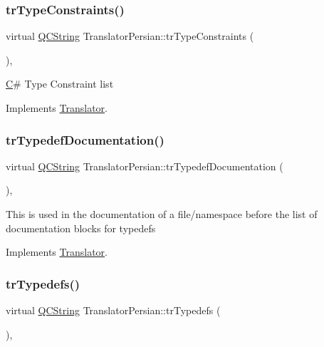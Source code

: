 \subsubsection{\texorpdfstring{trTypeConstraints()}{trTypeConstraints()}}
{\footnotesize\ttfamily virtual \mbox{\hyperlink{class_q_c_string}{Q\+C\+String}} Translator\+Persian\+::tr\+Type\+Constraints (\begin{DoxyParamCaption}{ }\end{DoxyParamCaption})\hspace{0.3cm}{\ttfamily [inline]}, {\ttfamily [virtual]}}

\mbox{\hyperlink{class_c}{C}}\# Type Constraint list 

Implements \mbox{\hyperlink{class_translator}{Translator}}.

\mbox{\label{class_translator_persian_ae42af4bc6b62abd9053d5a272d9ef079}} 
\subsubsection{\texorpdfstring{trTypedefDocumentation()}{trTypedefDocumentation()}}
{\footnotesize\ttfamily virtual \mbox{\hyperlink{class_q_c_string}{Q\+C\+String}} Translator\+Persian\+::tr\+Typedef\+Documentation (\begin{DoxyParamCaption}{ }\end{DoxyParamCaption})\hspace{0.3cm}{\ttfamily [inline]}, {\ttfamily [virtual]}}

This is used in the documentation of a file/namespace before the list of documentation blocks for typedefs 

Implements \mbox{\hyperlink{class_translator}{Translator}}.

\mbox{\label{class_translator_persian_ab8c3a5e7056ccdd34b9ae3c3b2ac3ed1}} 
\subsubsection{\texorpdfstring{trTypedefs()}{trTypedefs()}}
{\footnotesize\ttfamily virtual \mbox{\hyperlink{class_q_c_string}{Q\+C\+String}} Translator\+Persian\+::tr\+Typedefs (\begin{DoxyParamCaption}{ }\end{DoxyParamCaption})\hspace{0.3cm}{\ttfamily [inline]}, {\ttfamily [virtual]}}

